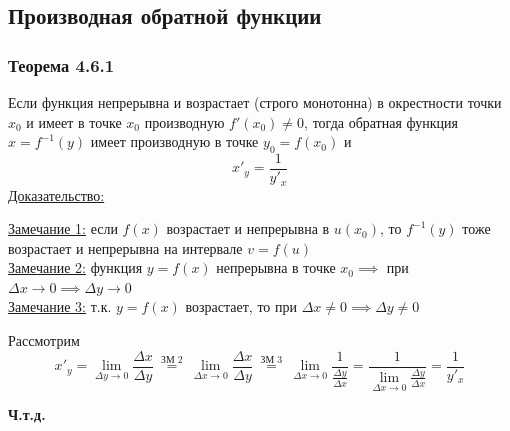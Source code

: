 \documentclass[12pt]{article}
\begin{document}
    \subsection{Производная обратной функции}
    \subsubsection*{Теорема 4.6.1}\label{th:4.6.1}
    Если функция непрерывна и возрастает (строго монотонна) в окрестности точки $x_0$ и имеет в точке $x_0$ производную $f'(x_0) \ne 0$, тогда обратная функция $x = f^{-1}(y)$ имеет производную в точке $y_0 = f(x_0)$ и \[ x'_y = \frac{1}{y'_x} \]
    \underline{Доказательство:}
    \begin{adjustwidth}{1.5em}{1.5em}
        \underline{Замечание 1:} если $f(x)$ возрастает и непрерывна в $u(x_0)$, то $f^{-1}(y)$ тоже возрастает и непрерывна на интервале $v = f(u)$\\
        \underline{Замечание 2:} функция $y = f(x)$ непрерывна в точке $x_0 \implies$ при $\Delta x \to 0 \implies \Delta y \to 0$\\
        \underline{Замечание 3:} т.к. $y = f(x)$ возрастает, то при $\Delta x \ne 0 \implies \Delta y \ne 0$\par\noindent
        Рассмотрим
        \[ x'_y = \lim_{\Delta y \to 0}\frac{\Delta x}{\Delta y} \overset{\text{  ЗМ 2  }}{=} \lim_{\Delta x \to 0}\frac{\Delta x}{\Delta y} \overset{\text{  ЗМ 3  }}{=} \lim_{\Delta x \to 0} \frac{1}{\frac{\Delta y}{\Delta x}} = \frac{1}{\lim_{\Delta x \to 0}\frac{\Delta y}{\Delta x}} = \frac{1}{y'_x} \]
        \begin{center}
            \textbf{Ч.т.д.}
        \end{center}
    \end{adjustwidth}
\end{document}
